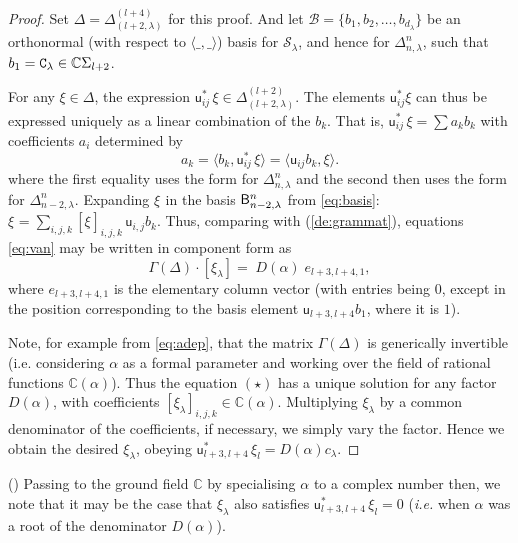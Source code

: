 \documentclass{article}
\newcommand{\ppm}[1]{\textcolor{red}{#1}}
\newcommand{\ppmm}[1]{#1}  %
\newcommand{\bajm}[1]{\textcolor{blue}{#1}}
\theoremstyle{definition}
\newcommand{\mdef}{\refstepcounter{theorem}       \medskip \noindent ({\bf \thetheorem}) }
\newcommand{\xx}{\alpha}       %
\newcommand{\Deltaa}{\Delta}   %
\newcommand{\Deltaaa}[2]{\Deltaa^{#1}_{#2}}
\newcommand{\Sym}{\Sigma}  %
\def\uu{{\mathsf u}} %
\def\SS{\mathcal{S}} %
\def\BB{\mathcal{B}} %
\def\a{\alpha}
\def\l{\lambda}
\def\C{\mathbb{C}}
\numberwithin{equation}{subsection}
\begin{document}
\begin{proof} 
Set $\Delta=\Delta^{(l+4)}_{(l+2,\l)}$ for this proof. 
And let $\BB=\{b_1,b_2,\dots, b_{d_\l}\}$ be an orthonormal (with respect to $\langle\_,\_\rangle$) basis for $\SS_\l$, 
\ppmm{and hence for $\Deltaaa{n}{n,\l}$}, 
such that 
$b_1= \nC_\l \in \C \Sym_{l+2}$.  

For any $\xi \in \Delta$, the expression 
$\uu_{ij}^* \, \xi \in \Delta^{(l+2)}_{(l+2,\l)}$. 
The elements $\uu_{ij}^* \xi$ can thus be expressed  %
uniquely as a linear combination of the $b_k$. That is,  $\uu_{ij}^* \, \xi=\sum a_k b_k$ with coefficients $a_i$ determined by
\[  
a_k  =  \langle b_k, \uu_{ij}^* \, \xi \rangle  =   \langle \uu_{ij} b_k, \xi \rangle. 
\]
\ppmm{where the first equality uses the form for $\Deltaaa{n}{n,\l}$ and the second then uses the form for $\Deltaaa{n}{n-2,\l}$}.
Expanding $\xi_{}$ in the basis $\BBB^n_{n-2,\l}$ from \eqref{eq:basis}:
$\xi_{}=\sum_{i,j,k} [\xi_{}]_{i,j,k} \, \uu_{i,j} b_k$.  
Thus, \ppmm{comparing with (\ref{de:grammat}),}
equations \eqref{eq:van} 
may be written in component form as
\[ 
\Gamma(\Delta) \cdot [\xi_{\l}] = \; \ppmm{D(\a)} \;  e_{l+3,l+4,1},  \tag{$\star$} \]
where $e_{l+3,l+4,1}$ is the elementary column vector 
(with entries being $0$, except in the position corresponding to the basis element $\uu_{l+3,l+4} b_1$, where it is $1$). 

Note, for example from  \eqref{eq:adep}, 
that the matrix $
\Gamma(\Delta)$ is generically invertible (i.e. considering $\a$ as a formal parameter and working over the field of rational functions $\C(\a)$). Thus the equation $(\star)$ has a unique solution 
for any factor \ppmm{$D(\a)$}, 
with coefficients $[\xi_{\l}]_{i,j,k}\in \C(\a)$. 
Multiplying $\xi_\l$ by a common denominator  %
of the coefficients, if necessary, we 
simply vary the factor. Hence we 
obtain the desired $\xi_\l$, obeying $\uu_{l+3,l+4}^* \, \xi_l=D(\a) c_\l$. 
\end{proof}


\mdef 
\ppmm{Passing to the ground field $\C$ by specialising $\xx$ to}
a complex number then, we note that it may be the case that $\xi_\l$ also satisfies $\uu_{l+3,l+4}^* \, \xi_l=0$ (\textit{i.e.} when $\a$ was a root of the denominator $D(\a)$).
\end{document}
